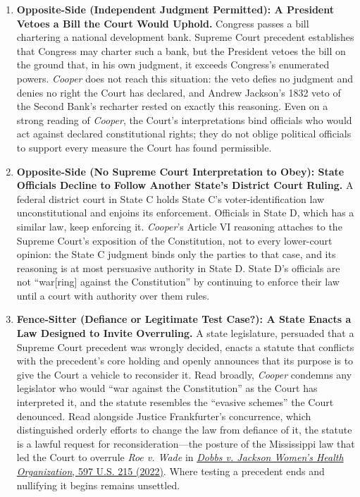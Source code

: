 \documentclass[12pt]{article}
\begin{document}
\begin{enumerate}
\item \textbf{Opposite-Side (Independent Judgment Permitted): A President Vetoes a Bill the Court Would Uphold.} Congress passes a bill chartering a national development bank. Supreme Court precedent establishes that Congress may charter such a bank, but the President vetoes the bill on the ground that, in his own judgment, it exceeds Congress's enumerated powers. \textit{Cooper} does not reach this situation: the veto defies no judgment and denies no right the Court has declared, and Andrew Jackson's 1832 veto of the Second Bank's recharter rested on exactly this reasoning. Even on a strong reading of \textit{Cooper}, the Court's interpretations bind officials who would act against declared constitutional rights; they do not oblige political officials to support every measure the Court has found permissible.

\item \textbf{Opposite-Side (No Supreme Court Interpretation to Obey): State Officials Decline to Follow Another State's District Court Ruling.} A federal district court in State C holds State C's voter-identification law unconstitutional and enjoins its enforcement. Officials in State D, which has a similar law, keep enforcing it. \textit{Cooper}'s Article VI reasoning attaches to the Supreme Court's exposition of the Constitution, not to every lower-court opinion: the State C judgment binds only the parties to that case, and its reasoning is at most persuasive authority in State D. State D's officials are not ``war[ring] against the Constitution'' by continuing to enforce their law until a court with authority over them rules.

\item \textbf{Fence-Sitter (Defiance or Legitimate Test Case?): A State Enacts a Law Designed to Invite Overruling.} A state legislature, persuaded that a Supreme Court precedent was wrongly decided, enacts a statute that conflicts with the precedent's core holding and openly announces that its purpose is to give the Court a vehicle to reconsider it. Read broadly, \textit{Cooper} condemns any legislator who would ``war against the Constitution'' as the Court has interpreted it, and the statute resembles the ``evasive schemes'' the Court denounced. Read alongside Justice Frankfurter's concurrence, which distinguished orderly efforts to change the law from defiance of it, the statute is a lawful request for reconsideration---the posture of the Mississippi law that led the Court to overrule \textit{Roe v. Wade} in \href{https://supreme.justia.com/cases/federal/us/597/19-1392/}{\textit{Dobbs v. Jackson Women's Health Organization}, 597 U.S. 215 (2022)}. Where testing a precedent ends and nullifying it begins remains unsettled.

\end{enumerate}
\end{document}
